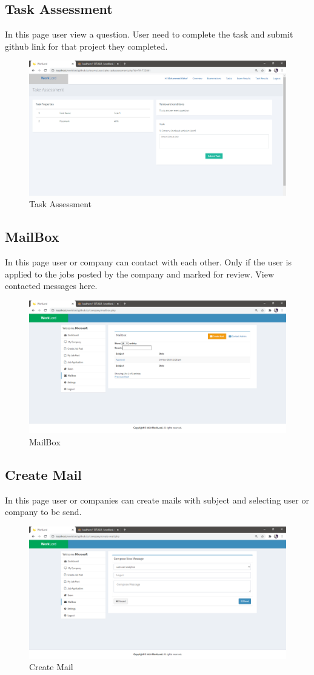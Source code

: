 \documentclass[a4paper,12pt]{report}
\begin{document}
\pagebreak

\subsection {Task Assessment}
In this page user view a question. User need to complete the task and submit github link for that project they completed.
\begin{figure}[bph]
	\centering
	\includegraphics[width=.7\linewidth ]{img/screenshots/user/task_assessment}
	\caption{Task Assessment}
\end{figure}

\subsection {MailBox}
In this page user or company can contact with each other. Only if the user is applied to the jobs posted by the company and marked for review. View contacted messages here.
\begin{figure}[bph]
	\centering
	\includegraphics[width=.7\linewidth ]{img/screenshots/mailbox}
	\caption{MailBox}
\end{figure}

\pagebreak

\subsection {Create Mail}
In this page user or companies can create mails with subject and selecting user or company to be send.
\begin{figure}[bph]
	\centering
	\includegraphics[width=.7\linewidth ]{img/screenshots/createmail}
	\caption{Create Mail}
\end{figure}
\end{document}
